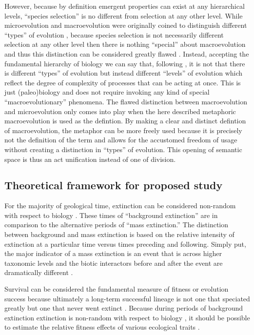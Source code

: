 \documentclass[12pt,letterpaper]{article}
\begin{document}

However, because by definition emergent properties can exist at any hierarchical levels, ``species selection'' is no different from selection at any other level. While microevolution and macroevolution were originally coined to distinguish different ``types'' of evolution \citep{Goldschmidt1940}, because species selection is not necessarily different selection at any other level then there is nothing ``special'' about macroevolution and thus this distinction can be considered greatly flawed \citep{Simpson1953}. Instead, accepting the fundamental hierarchy of biology \citep{Vrba1984} we can say that, following \citet{Simpson1953}, it is not that there is different ``types'' of evolution but instead different ``levels'' of evolution which reflect the degree of complexity of processes that can be acting at once. This is just (paleo)biology and does not require invoking any kind of special ``macroevolutionary'' phenomena. The flawed distinction between macroevolution and microevolution only comes into play when the here described metaphoric macroevolution is used as the defintion. By making a clear and distinct defintion of macroevolution, the metaphor can be more freely used because it is precisely not the definition of the term and allows for the accustomed freedom of usage without creating a distinction in ``types'' of evolution. This opening of semantic space is thus an act unification instead of one of division. 


\subsection{Theoretical framework for proposed study}
For the majority of geological time, extinction can be considered non-random with respect to biology \citep{Jablonski1986}. These times of ``background extinction'' are in comparison to the alternative periods of ``mass extinction.'' The distinction between background and mass extinction is based on the relative intensity of extinction at a particular time versus times preceding and following. Simply put, the major indicator of a mass extinction is an event that is across higher taxonomic levels and the biotic interactors before and after the event are dramatically different \citep{Jablonski1986,Jablonski2005,Kitchell1986,Kitchell1991}.

Survival can be considered the fundamental measure of fitness or evolution success because ultimately a long-term successful lineage is not one that speciated greatly but one that never went extinct \citep{Cooper1984,Palmer2012}. Because during periods of background extinction extinction is non-random with respect to biology \citep{Jablonski1986}, it should be possible to estimate the relative fitness effects of various ecological traits \citep{Kitchell1990,Kitchell1985a}. 
\end{document}
